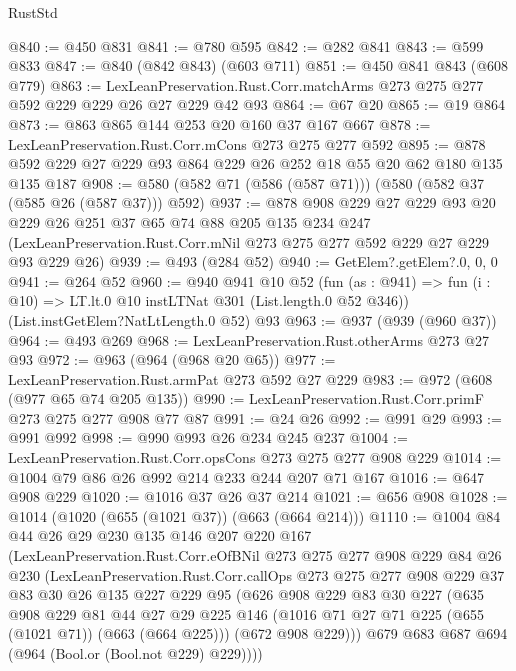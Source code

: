 \begin{lexlean}{RustStd}
\begin{coremodule}
@840 := @450 @831
@841 := @780 @595
@842 := @282 @841
@843 := @599 @833
@847 := @840 (@842 @843) (@603 @711)
@851 := @450 @841 @843 (@608 @779)
@863 := LexLeanPreservation.Rust.Corr.matchArms @273 @275 @277 @592 @229 @229 @26 @27 @229 @42 @93
@864 := @67 @20
@865 := @19 @864
@873 := @863 @865 @144 @253 @20 @160 @37 @167 @667
@878 := LexLeanPreservation.Rust.Corr.mCons @273 @275 @277 @592
@895 := @878 @592 @229 @27 @229 @93 @864 @229 @26 @252 @18 @55 @20 @62 @180 @135 @135 @187
@908 := @580 (@582 @71 (@586 (@587 @71))) (@580 (@582 @37 (@585 @26 (@587 @37))) @592)
@937 := @878
    @908
    @229
    @27
    @229
    @93
    @20
    @229
    @26
    @251
    @37
    @65
    @74
    @88
    @205
    @135
    @234
    @247
    (LexLeanPreservation.Rust.Corr.mNil @273 @275 @277 @592 @229 @27 @229 @93 @229 @26)
@939 := @493 (@284 @52)
@940 := GetElem?.getElem?.{0, 0, 0}
@941 := @264 @52
@960 := @940
    @941
    @10
    @52
    (fun (as : @941) => fun (i : @10) => LT.lt.{0} @10 instLTNat @301 (List.length.{0} @52 @346))
    (List.instGetElem?NatLtLength.{0} @52)
    @93
@963 := @937 (@939 (@960 @37))
@964 := @493 @269
@968 := LexLeanPreservation.Rust.otherArms @273 @27 @93
@972 := @963 (@964 (@968 @20 @65))
@977 := LexLeanPreservation.Rust.armPat @273 @592 @27 @229
@983 := @972 (@608 (@977 @65 @74 @205 @135))
@990 := LexLeanPreservation.Rust.Corr.primF @273 @275 @277 @908 @77 @87
@991 := @24 @26
@992 := @991 @29
@993 := @991 @992
@998 := @990 @993 @26 @234 @245 @237
@1004 := LexLeanPreservation.Rust.Corr.opsCons @273 @275 @277 @908 @229
@1014 := @1004 @79 @86 @26 @992 @214 @233 @244 @207 @71 @167
@1016 := @647 @908 @229
@1020 := @1016 @37 @26 @37 @214
@1021 := @656 @908
@1028 := @1014 (@1020 (@655 (@1021 @37)) (@663 (@664 @214)))
@1110 := @1004
    @84
    @44
    @26
    @29
    @230
    @135
    @146
    @207
    @220
    @167
    (LexLeanPreservation.Rust.Corr.eOfBNil
      @273
      @275
      @277
      @908
      @229
      @84
      @26
      @230
      (LexLeanPreservation.Rust.Corr.callOps
        @273
        @275
        @277
        @908
        @229
        @37
        @83
        @30
        @26
        @135
        @227
        @229
        @95
        (@626
          @908
          @229
          @83
          @30
          @227
          (@635
            @908
            @229
            @81
            @44
            @27
            @29
            @225
            @146
            (@1016 @71 @27 @71 @225 (@655 (@1021 @71)) (@663 (@664 @225)))
            (@672 @908 @229)))
        @679
        @683
        @687
        @694
        (@964 (Bool.or (Bool.not @229) @229))))

\end{coremodule}
\end{lexlean}
